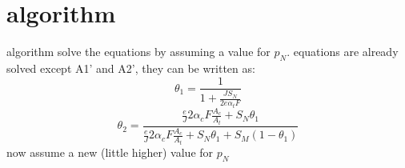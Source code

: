 \documentclass{beamer}
\begin{document}
\section{algorithm}
\begin{frame}{algorithm}
	solve the equations by assuming a value for $p_{N}$. equations are already solved except A1' and A2', they can be written as:
	\begin{equation} \theta_{1}=\frac{1}{1+\frac{JS_{N}}{2e\alpha_{t}F}}  \end{equation}
		\begin{equation} \theta_{2}=\frac{\frac{e}{J}2\alpha_{c}F\frac{A_{c}}{A_{t}}+S_N\theta_{1}}{\frac{e}{J}2\alpha_{c}F\frac{A_{c}}{A_{t}}+S_N\theta_{1}+S_{M}(1-\theta_{1})}  \end{equation}
			now assume a new (little higher) value for $p_{N}$
\end{frame}
\end{document}
